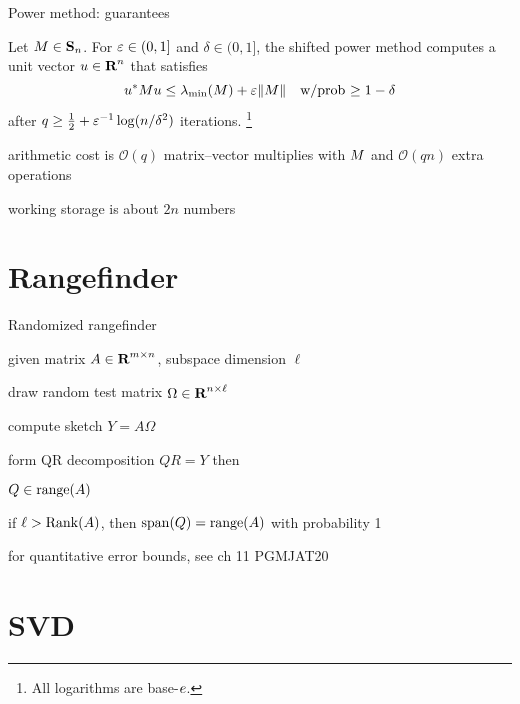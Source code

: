 \documentclass[presentation,xcolor={usenames,dvipsnames}]{beamer}
\begin{document}
\begin{frame}{Power method: guarantees}

\begin{fact}
Let $M \in \mathbf{S}_n$. For $\varepsilon \in (0,1]$ and $\delta \in (0, 1]$,
the shifted power method
computes a unit vector $u \in {\mbox{\bf R}}^n$ that satisfies
$$
u^* M u \leq \lambda_{\min}(M) + \varepsilon \|M\|
\quad\text{w/prob $\geq 1 - \delta$}
$$
after $q \geq \tfrac{1}{2} + \varepsilon^{-1} \log(n/\delta^2)$ iterations.%
\footnote{All logarithms are base-$e$.}
\end{fact}

\vfill
\bit
\item arithmetic cost is $\mathcal{O}( q )$ matrix--vector multiplies with $M$ and $\mathcal{O}(q n)$ extra operations
\item working storage is about $2n$ numbers
\eit

\end{frame}

\section{Rangefinder}

\begin{frame}{Randomized rangefinder}

given matrix $A \in {\mbox{\bf R}}^{m \times n}$, subspace dimension $\ell$
\bit
\item draw random test matrix $\Omega \in {\mbox{\bf R}}^{n \times \ell}$
\item compute sketch $Y = A \Omega$ 
\item form QR decomposition $QR = Y$ 
\eit
\pause \vfill
then
\bit
\item $Q \in \mbox{\textrm{range}}(A)$
\item if $\ell > \mbox{\textrm{Rank}}(A)$, then $\mbox{\textrm{span}}(Q) = \mbox{\textrm{range}}(A)$ with probability 1
\item for quantitative error bounds, see ch 11 PGMJAT20
\eit

\end{frame}

\section{SVD}
\end{document}
